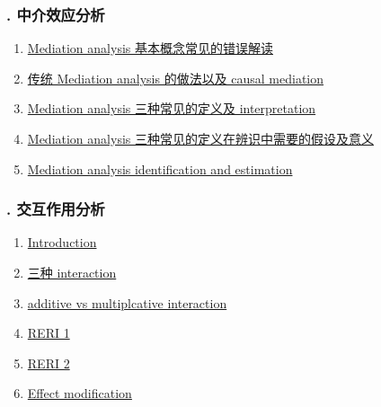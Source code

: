 \documentclass[11pt]{article}
\begin{document}
\vspace{-1cm}

\subsubsection*{. 中介效应分析}

\vspace{-0.5cm}

\begin{enumerate}
	\item \href{https://mp.weixin.qq.com/s/QVo-71WwLWt99ljKQOtXtg}{Mediation analysis 基本概念常见的错误解读}	%
	\item \href{https://mp.weixin.qq.com/s/tzJnVwOSfnCNbJtr9ksGUQ}{传统 Mediation analysis 的做法以及 causal mediation}	%
	\item \href{https://mp.weixin.qq.com/s/KPbpaspmIonZpCDdAFJbpQ}{Mediation analysis 三种常见的定义及 interpretation}	%
	\item \href{https://mp.weixin.qq.com/s/AoNnTWP3dMCCcmskwfvJ0g}{Mediation analysis 三种常见的定义在辨识中需要的假设及意义}	%
	\item \href{https://mp.weixin.qq.com/s/9hUGxYCy_a8UWkwXy78tAw}{Mediation analysis identification and estimation}	%
\end{enumerate}

\vspace{-1cm}

\subsubsection*{. 交互作用分析}

\vspace{-0.5cm}

\begin{multicols}{2}
	\begin{enumerate}
		\item \href{https://mp.weixin.qq.com/s/E7txm3jtXFuGbGS_b9yMFw}{Introduction}	%
		\item \href{https://mp.weixin.qq.com/s/t51Bs8d73iR8unozout9yA}{三种 interaction}	%
		\item \href{https://mp.weixin.qq.com/s/zcVLsoAjGCEkPOF5eASvjA}{additive vs multiplcative interaction}	%
		\item \href{https://mp.weixin.qq.com/s/OVingr4LK-R979zHzAG3NA}{RERI 1}	%
		\item \href{https://mp.weixin.qq.com/s/RfIYqjLL90LQLCB0eryeLA}{RERI 2}	%
		\item \href{https://mp.weixin.qq.com/s/VW9h_Bztrchcg3tMyBM8zA}{Effect modification}	%
	\end{enumerate}
\end{multicols}
\end{document}
